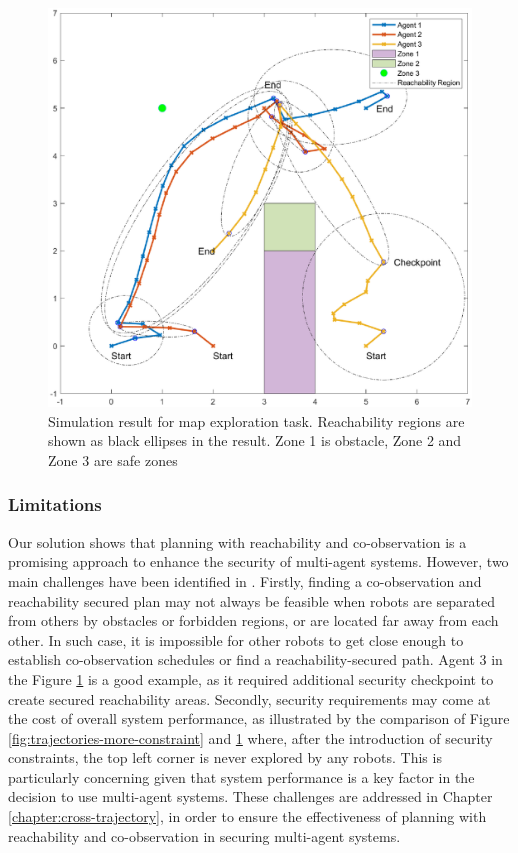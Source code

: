 \documentclass[journal]{IEEEtran}  %
\begin{document}
\begin{figure}[htbp]
\begin{center}
\includegraphics[width=0.6\linewidth]{FinalResult}
\caption{Simulation result for map exploration task. Reachability regions are shown as black ellipses in the result. Zone 1 is obstacle, Zone 2 and Zone 3 are safe zones}
\label{fig:ReachabilitySimulation}
\end{center}
\end{figure}

\subsubsection{Limitations}\label{sec:reachability-discussion}
Our solution shows that planning with reachability and co-observation is a promising approach to enhance the security of multi-agent systems. However, two main challenges have been identified in \cite{wardega2023hola}. Firstly, finding a co-observation and reachability secured plan may not always be feasible when robots are separated from others by obstacles or forbidden regions, or are located far away from each other. In such case, it is impossible for other robots to get close enough to establish co-observation schedules or find a reachability-secured path. Agent 3 in the Figure \ref{fig:ReachabilitySimulation} is a good example, as it required additional security checkpoint to create secured reachability areas. Secondly, security requirements may come at the cost of overall system performance, as illustrated by the comparison of Figure \ref{fig:trajectories-more-constraint} and \ref{fig:ReachabilitySimulation} where, after the introduction of security constraints, the top left corner is never explored by any robots. This is particularly concerning given that system performance is a key factor in the decision to use multi-agent systems. These challenges are addressed in Chapter \ref{chapter:cross-trajectory}, in order to ensure the effectiveness of planning with reachability and co-observation in securing multi-agent systems.
\end{document}
